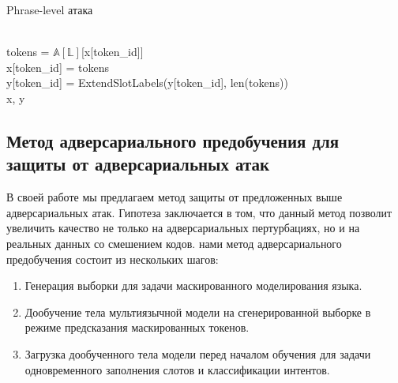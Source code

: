 \begin{algorithm}
    \caption{Phrase-level атака}
    \begin{algorithmic}
                \\
                \ind\ind tokens = $\mathbb{A}[\mathbb{L}]$[x[token\_id]]\\
                \ind\ind x[token\_id] = tokens\\
                \ind\ind y[token\_id] = ExtendSlotLabels(y[token\_id], len(tokens))
            \EndIf \\
            \ind\Return x, y
        \EndFunction
    \end{algorithmic}\label{alg:algorithm2}
\end{algorithm}



\newpage

\subsection{Метод адверсариального предобучения для защиты от адверсариальных атак}
В своей работе мы предлагаем метод защиты от предложенных выше адверсариальных атак.
Гипотеза заключается в том, что данный метод позволит увеличить качество не только на адверсариальных пертурбациях, но и на реальных данных со смешением кодов.
 нами метод адверсариального предобучения состоит из нескольких шагов:
\begin{enumerate}
    \item Генерация выборки для задачи маскированного моделирования языка.
    \item Дообучение тела мультиязычной модели на сгенерированной выборке в режиме предсказания маскированных токенов.
    \item Загрузка дообученного тела модели перед началом обучения для задачи одновременного заполнения слотов и классификации интентов.
\end{enumerate}

